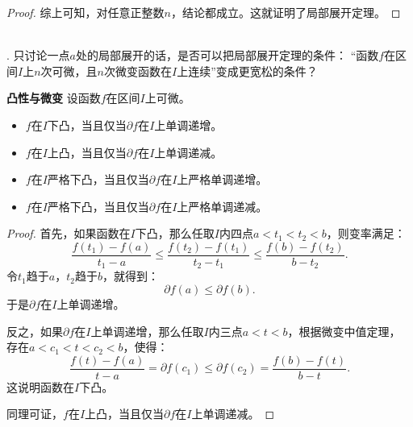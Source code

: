 \documentclass[12pt,UTF8,fontset=none]{ctexbook}
\begin{document}
\begin{appendix}
\begin{proof}
    综上可知，对任意正整数$n$，结论都成立。这就证明了局部展开定理。
\end{proof}

\begin{sk}
    \mbox{} \\
    . 只讨论一点$a$处的局部展开的话，是否可以把局部展开定理的条件：
    “函数$f$在区间$I$上$n$次可微，且$n$次微变函数在$I$上连续”变成更宽松的条件？\\
\end{sk}

\begin{tm}{\textbf{凸性与微变}}
    设函数$f$在区间$I$上可微。
    \begin{itemize}
        \item $f$在$I$下凸，当且仅当$\partial f$在$I$上单调递增。
        \item $f$在$I$上凸，当且仅当$\partial f$在$I$上单调递减。
        \item $f$在$I$严格下凸，当且仅当$\partial f$在$I$上严格单调递增。
        \item $f$在$I$严格下凸，当且仅当$\partial f$在$I$上严格单调递减。
    \end{itemize}
\end{tm}

\begin{proof}
    首先，如果函数在$I$下凸，那么任取$I$内四点$a < t_1 < t_2 < b$，则变率满足：
    $$ \frac{f(t_1) - f(a)}{t_1 - a} \leqslant \frac{f(t_2) - f(t_1)}{t_2 - t_1} \leqslant \frac{f(b) - f(t_2)}{b - t_2}. $$
    令$t_1$趋于$a$，$t_2$趋于$b$，就得到：
    $$ \partial f(a) \leqslant \partial f(b).$$
    于是$\partial f$在$I$上单调递增。

    反之，如果$\partial f$在$I$上单调递增，那么任取$I$内三点$a < t < b$，根据微变中值定理，
    存在$a < c_1 < t < c_2 < b$，使得：
    $$ \frac{f(t) - f(a)}{t - a} = \partial f(c_1) \leqslant  \partial f(c_2) = \frac{f(b) - f(t)}{b - t}. $$
    这说明函数在$I$下凸。

    同理可证，$f$在$I$上凸，当且仅当$\partial f$在$I$上单调递减。


\end{proof}
\end{appendix}
\end{document}
